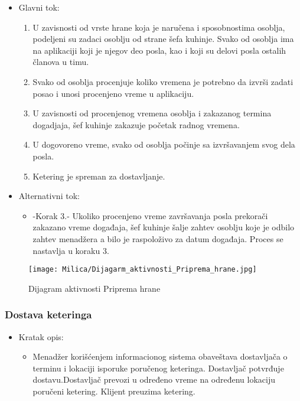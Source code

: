\documentclass[a4paper]{article}
\begin{document}
      \begin{itemize}
        \item Glavni tok:
          \begin{enumerate}
              
        
              \item U zavisnosti od vrste hrane koja je naručena i sposobnostima osoblja, podeljeni su zadaci osoblju od strane šefa kuhinje. Svako od osoblja ima na aplikaciji koji je njegov deo posla, kao i koji su delovi posla ostalih članova u timu. 
        
              \item Svako od osoblja procenjuje koliko vremena je potrebno da izvrši zadati posao i  unosi procenjeno vreme u aplikaciju.
         
              \item U zavisnosti od procenjenog vremena osoblja i zakazanog termina dogadjaja, šef kuhinje zakazuje početak radnog vremena.
       
              \item U dogovoreno vreme, svako od osoblja počinje sa izvršavanjem svog dela posla.
          
              \item Ketering je spreman za dostavljanje.
          \end{enumerate}
    \end{itemize}
      \begin{itemize}
        \item Alternativni tok:
          \begin{itemize}
        \item -Korak 3.- Ukoliko procenjeno vreme završavanja posla prekorači zakazano vreme događaja, šef kuhinje šalje zahtev osoblju koje je odbilo zahtev menadžera a bilo je raspoloživo za datum događaja. Proces se nastavlja u koraku 3.
    \end{itemize}
    \end{itemize}
    
\begin{figure}[H]
    \centering
    \texttt{[image: Milica/Dijagarm\_aktivnosti\_Priprema\_hrane.jpg]}
    \caption{Dijagram aktivnosti Priprema hrane }
    \label{fig:RegistracijaZ}
\end{figure}
    

\subsubsection{Dostava keteringa}
\begin{itemize}
    \item Kratak opis:
    \begin{itemize}
 
        \item Menadžer korišćenjem informacionog sistema obaveštava dostavljača o terminu i lokaciji isporuke poručenog keteringa. Dostavljač potvrđuje dostavu.Dostavljač prevozi u određeno vreme na određenu lokaciju poručeni ketering.
        Klijent preuzima ketering.
    \end{itemize}
    
    
\end{itemize}
\end{document}

